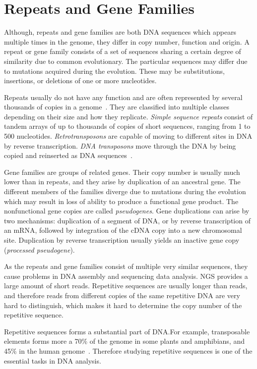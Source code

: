 \chapter[Rep.\ and Gene Fam.]{Repeats and Gene Families}\label{chap:repeatsfamilies}

Although, repeats and gene families are both DNA sequences which appears multiple times in the genome, they differ in copy number, function and origin.
A repeat or gene family consists of a set of sequences sharing a certain degree of similarity due to common evolutionary. The particular sequences may differ due to mutations acquired during the evolution. These may be substitutions, insertions, or deletions of one or more nucleotides.

Repeats usually do not have any function and are often represented by several thousands of copies in a genome~\cite{cell}. They are classified into multiple classes depending on their size and how they replicate.
\emph{Simple sequence repeats} consist of tandem arrays of up to thousands of copies of short sequences, ranging from 1 to 500 nucleotides.
\emph{Retrotransposons} are capable of moving to different sites in DNA by reverse transcription.
\emph{DNA transposons} move through the DNA by being copied and reinserted as DNA sequences~\cite{cell}.

Gene families are groups of related genes.
Their copy number is usually much lower than in repeats, and they arise by duplication of an ancestral gene. The different members of the families diverge due to mutations during the evolution which may result in loss of ability to produce a functional gene product. The nonfunctional gene copies are called \emph{pseudogenes}.
Gene duplications can arise by two mechanisms: duplication of a segment of DNA, or by reverse transcription of an mRNA, followed by integration of the cDNA copy into a new chromosomal site.
Duplication by reverse transcription usually yields an inactive gene copy (\emph{processed pseudogene}).

As the repeats and gene families consist of multiple very similar sequences, they cause problems in DNA assembly and sequencing data analysis. NGS provides a large amount of short reads. Repetitive sequences are usually longer than reads, and therefore reads from different copies of the same repetitive DNA are very hard to distinguish, which makes it hard to determine the copy number of the repetitive sequence.

Repetitive sequences forms a substantial part of DNA.\@ For example,
transposable elements forms more a 70\% of the genome in some plants and amphibians, and 45\% in the human genome~\cite{biemont2006genetics}.
Therefore studying repetitive sequences is one of the essential tasks in DNA analysis.

